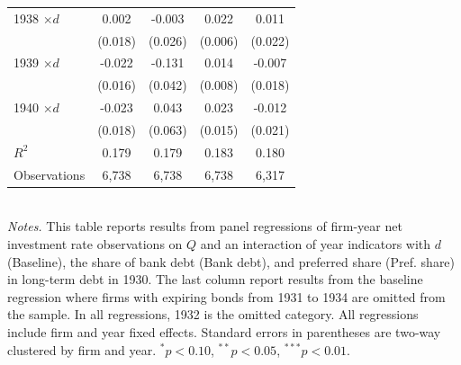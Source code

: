 \begin{table}[p]
\begin{tabular}{lcccc}
1938 $\times d$ & 0.002 & -0.003 & 0.022\sym{***} & 0.011 \\
                & (0.018) & (0.026) & (0.006) & (0.022) \\
1939 $\times d$ & -0.022 & -0.131\sym{***} & 0.014 & -0.007 \\
                & (0.016) & (0.042) & (0.008) & (0.018) \\
1940 $\times d$ & -0.023 & 0.043 & 0.023 & -0.012 \\
                & (0.018) & (0.063) & (0.015) & (0.021) \\
\midrule
$R^2$           & 0.179 & 0.179 & 0.183 & 0.180 \\
Observations    & 6{,}738 & 6{,}738 & 6{,}738 & 6{,}317 \\
\bottomrule
\end{tabular}\\

\vspace*{3mm} \justifying \noindent
\footnotesize{\textit{Notes.} This table reports results from panel regressions of firm-year net investment rate observations on $Q$ and an interaction of year indicators with $d$ (Baseline), the share of bank debt (Bank debt), and preferred share (Pref. share) in long-term debt in 1930. The last column report results from the baseline regression where firms with expiring bonds from 1931 to 1934 are omitted from the sample. In all regressions, 1932 is the omitted category. All regressions include firm and year fixed effects. Standard errors in parentheses are two-way clustered by firm and year. $^{*}p<0.10$, $^{**}p<0.05$, $^{***}p<0.01$.}
\end{table}